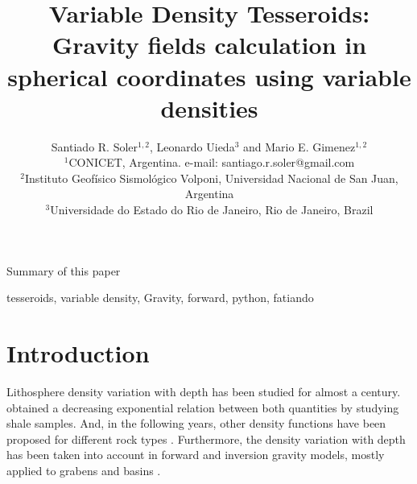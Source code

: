 \documentclass[extra]{gji}
\begin{document}
\title[
    Variable Density Tesseroids]
    {Variable Density Tesseroids: Gravity fields calculation in spherical coordinates using variable densities
}
\author[S.R. Soler, L. Uieda and M.E. Gimenez]
    {Santiado R. Soler$^{1,2}$, Leonardo Uieda$^3$ and Mario E. Gimenez$^{1,2}$ \\
    $^1$CONICET, Argentina. e-mail: santiago.r.soler@gmail.com\\
    $^2$Instituto Geofísico Sismológico Volponi, Universidad Nacional de San Juan, Argentina\\
    $^3$Universidade do Estado do Rio de Janeiro, Rio de Janeiro, Brazil
    }


\maketitle

\begin{summary}
Summary of this paper 
\end{summary}

\begin{keywords}
tesseroids, variable density, Gravity, forward, python, fatiando
\end{keywords}



\section{Introduction}

Lithosphere density variation with depth has been studied for almost a century. 
\citet{Athy1930} obtained a decreasing exponential relation between both quantities by studying shale samples.
And, in the following years, other density functions have been proposed for different rock types \citep[e.g.][]{Maxant1980, Rao1986, Rao1993, Rao1994}.
Furthermore, the density variation with depth has been taken into account in forward and inversion gravity models, mostly applied to grabens and basins \citep{Cordell1973, Rao1986, Cowie1990, Rao1993, Rao1994, Welford2010}.
\end{document}

